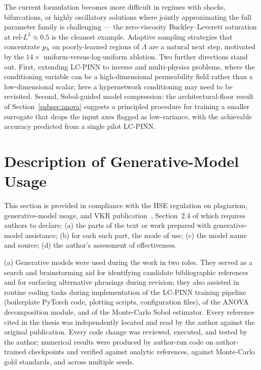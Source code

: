 \documentclass[12pt,a4paper]{extarticle}
\begin{document}
The current formulation becomes more difficult in regimes with shocks, bifurcations, or highly oscillatory solutions where jointly approximating the full parameter family is challenging --- the zero-viscosity Buckley--Leverett saturation at rel-$L^2 \approx 0.5$ is the cleanest example. Adaptive sampling strategies that concentrate $p_\lambda$ on poorly-learned regions of $\Lambda$ are a natural next step, motivated by the $14\times$ uniform-versus-log-uniform ablation. Two further directions stand out. First, extending LC-PINN to inverse and multi-physics problems, where the conditioning variable can be a high-dimensional permeability field rather than a low-dimensional scalar; here a hypernetwork conditioning may need to be revisited. Second, Sobol-guided model compression: the architectural-floor result of Section~\ref{subsec:anova} suggests a principled procedure for training a smaller surrogate that drops the input axes flagged as low-variance, with the achievable accuracy predicted from a single pilot LC-PINN.

\newpage

\section{Description of Generative-Model Usage}
\label{sec:gen-ai}

This section is provided in compliance with the HSE regulation on plagiarism, generative-model usage, and VKR publication~\cite{hse_ai_regulation}, Section~2.4 of which requires authors to declare: (a) the parts of the text or work prepared with generative-model assistance; (b) for each such part, the mode of use; (c) the model name and source; (d) the author's assessment of effectiveness.

(a) Generative models were used during the work in two roles. They served as a search and brainstorming aid for identifying candidate bibliographic references and for surfacing alternative phrasings during revision; they also assisted in routine coding tasks during implementation of the LC-PINN training pipeline (boilerplate PyTorch code, plotting scripts, configuration files), of the ANOVA decomposition module, and of the Monte-Carlo Sobol estimator. Every reference cited in the thesis was independently located and read by the author against the original publication. Every code change was reviewed, executed, and tested by the author; numerical results were produced by author-run code on author-trained checkpoints and verified against analytic references, against Monte-Carlo gold standards, and across multiple seeds.
\end{document}
